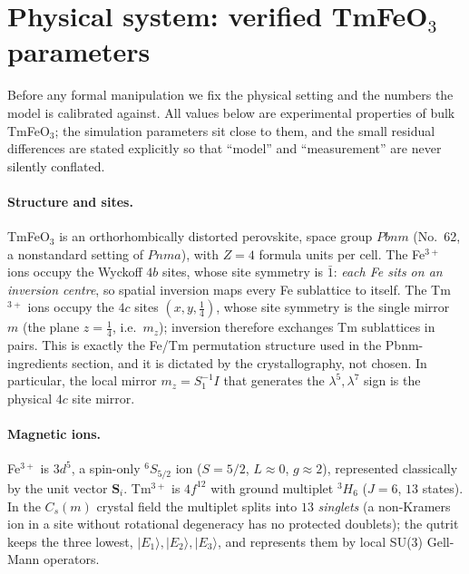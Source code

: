 \documentclass[11pt,a4paper]{article}
\newcommand{\ket}[1]{|#1\rangle}
\newcommand{\ve}[1]{\boldsymbol{#1}}
\begin{document}
\section{Physical system: verified TmFeO$_3$ parameters}
\label{sec:tmfeo3-facts}

Before any formal manipulation we fix the physical setting and the numbers the
model is calibrated against.  All values below are experimental properties of
bulk TmFeO$_3$; the simulation parameters sit close to them, and the small
residual differences are stated explicitly so that ``model'' and
``measurement'' are never silently conflated.

\paragraph{Structure and sites.}
TmFeO$_3$ is an orthorhombically distorted perovskite, space group $Pbnm$
(No.\ 62, a nonstandard setting of $Pnma$), with $Z=4$ formula units per cell.
The Fe$^{3+}$ ions occupy the Wyckoff $4b$ sites, whose site symmetry is
$\bar 1$: \emph{each Fe sits on an inversion centre}, so spatial inversion maps
every Fe sublattice to itself.  The Tm$^{3+}$ ions occupy the $4c$ sites
$(x,y,\tfrac14)$, whose site symmetry is the single mirror $m$ (the plane
$z=\tfrac14$, i.e.\ $m_z$); inversion therefore exchanges Tm sublattices in
pairs.  This is exactly the Fe/Tm permutation structure used in the
Pbnm-ingredients section, and it is dictated by the crystallography, not
chosen.  In particular, the local mirror $m_z=S_1^{-1}I$ that generates the
$\lambda^5,\lambda^7$ sign is the physical $4c$ site mirror.

\paragraph{Magnetic ions.}
Fe$^{3+}$ is $3d^5$, a spin-only $^6S_{5/2}$ ion ($S=5/2$, $L\approx0$,
$g\approx2$), represented classically by the unit vector $\ve S_i$.
Tm$^{3+}$ is $4f^{12}$ with ground multiplet $^3H_6$ ($J=6$, $13$ states).  In
the $C_s(m)$ crystal field the multiplet splits into $13$ \emph{singlets}
(a non-Kramers ion in a site without rotational degeneracy has no protected
doublets); the qutrit keeps the three lowest, $\ket{E_1},\ket{E_2},\ket{E_3}$,
and represents them by local SU(3) Gell-Mann operators.
\end{document}
